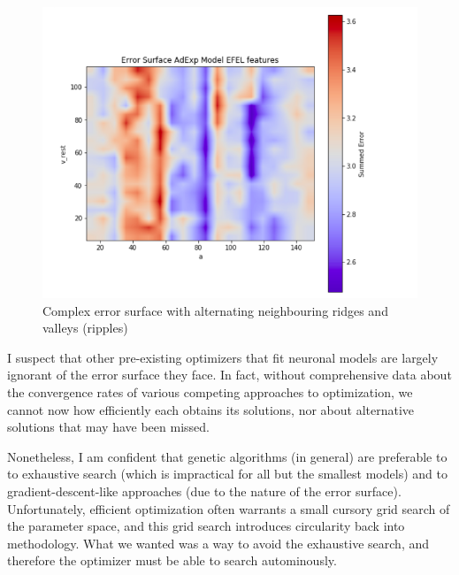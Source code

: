\begin{figure}
    \centering
    \includegraphics[scale=1.25]{figures/third_error_surface.png}
        \caption[Complex but not hopeless error surfaces]{Complex error surface with alternating neighbouring ridges and valleys (ripples)}
    \label{fig:real_problem_nontrivial_surface}
\end{figure}

I suspect that other pre-existing optimizers that fit neuronal models are largely ignorant of the error surface they face.
In fact, without comprehensive data about the convergence rates of various competing approaches to optimization, we cannot now how efficiently each obtains its solutions, nor about alternative solutions that may have been missed.

Nonetheless, I am confident that genetic algorithms (in general) are preferable to to exhaustive search (which is impractical for all but the smallest models) and to gradient-descent-like approaches (due to the nature of the error surface).
Unfortunately, efficient optimization often warrants a small cursory grid search of the parameter space, and this grid search introduces circularity back into methodology. What we wanted was a way to avoid the exhaustive search, and therefore the optimizer must be able to search autominously.


